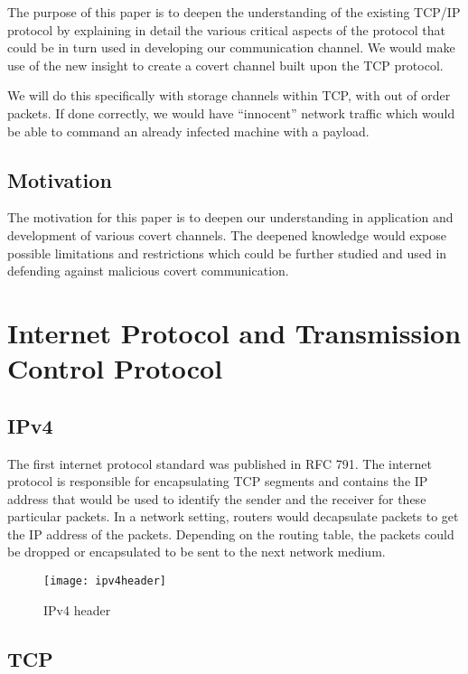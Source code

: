 \documentclass[letterpaper,twocolumn,10pt]{article}
\begin{document}
The purpose of this paper is to deepen the understanding of the existing TCP/IP protocol by explaining in detail the various critical aspects of the protocol that could be in turn used in developing our communication channel. We would make use of the new insight to create a covert channel built upon the TCP protocol. 

We will do this specifically with storage channels within TCP, with out of order packets. If done correctly, we would have “innocent” network traffic which would be able to command an already infected machine with a payload.

\subsection{Motivation}

The motivation for this paper is to deepen our understanding in application and development of various covert channels. The deepened knowledge would expose possible limitations and restrictions which could be further studied and used in defending against malicious covert communication. 


\section{Internet Protocol and Transmission Control Protocol}

\subsection{IPv4}

The first internet protocol standard was published in RFC 791\cite{datatracker}. The internet protocol is responsible for encapsulating TCP segments and contains the IP address that would be used to identify the sender and the receiver for these particular packets. In a network setting, routers would decapsulate packets to get the IP address of the packets. Depending on the routing table, the packets could be dropped or encapsulated to be sent to the next network medium.

\begin{figure}[htp]
    \centering
    \texttt{[image: ipv4header]}
    \caption{IPv4 header}
\end{figure}

\subsection{TCP}
\end{document}
